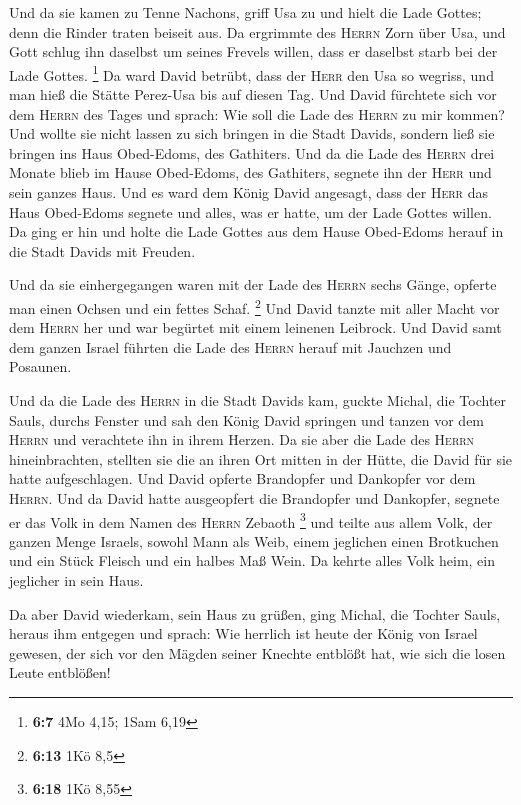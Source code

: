  Und da sie kamen zu Tenne Nachons, griff Usa zu und hielt
die Lade Gottes; denn die Rinder traten beiseit aus.  Da
ergrimmte des \textsc{Herrn} Zorn über Usa, und Gott schlug ihn daselbst
um seines Frevels willen, dass er daselbst starb bei der Lade Gottes.
\footnote{\textbf{6:7} 4Mo 4,15; 1Sam 6,19}  Da ward David
betrübt, dass der \textsc{Herr} den Usa so wegriss, und man hieß die
Stätte Perez-Usa bis auf diesen Tag.  Und David fürchtete
sich vor dem \textsc{Herrn} des Tages und sprach: Wie soll die Lade des
\textsc{Herrn} zu mir kommen?  Und wollte sie nicht
lassen zu sich bringen in die Stadt Davids, sondern ließ sie bringen ins
Haus Obed-Edoms, des Gathiters.  Und da die Lade des
\textsc{Herrn} drei Monate blieb im Hause Obed-Edoms, des Gathiters,
segnete ihn der \textsc{Herr} und sein ganzes Haus.  Und
es ward dem König David angesagt, dass der \textsc{Herr} das Haus
Obed-Edoms segnete und alles, was er hatte, um der Lade Gottes willen.
Da ging er hin und holte die Lade Gottes aus dem Hause Obed-Edoms herauf
in die Stadt Davids mit Freuden.

 Und da sie einhergegangen waren mit der Lade des
\textsc{Herrn} sechs Gänge, opferte man einen Ochsen und ein fettes
Schaf. \footnote{\textbf{6:13} 1Kö 8,5}  Und David tanzte
mit aller Macht vor dem \textsc{Herrn} her und war begürtet mit einem
leinenen Leibrock.  Und David samt dem ganzen Israel
führten die Lade des \textsc{Herrn} herauf mit Jauchzen und Posaunen.

 Und da die Lade des \textsc{Herrn} in die Stadt Davids
kam, guckte Michal, die Tochter Sauls, durchs Fenster und sah den König
David springen und tanzen vor dem \textsc{Herrn} und verachtete ihn in
ihrem Herzen.  Da sie aber die Lade des \textsc{Herrn}
hineinbrachten, stellten sie die an ihren Ort mitten in der Hütte, die
David für sie hatte aufgeschlagen. Und David opferte Brandopfer und
Dankopfer vor dem \textsc{Herrn}.  Und da David hatte
ausgeopfert die Brandopfer und Dankopfer, segnete er das Volk in dem
Namen des \textsc{Herrn} Zebaoth \footnote{\textbf{6:18} 1Kö 8,55}
 und teilte aus allem Volk, der ganzen Menge Israels,
sowohl Mann als Weib, einem jeglichen einen Brotkuchen und ein Stück
Fleisch und ein halbes Maß Wein. Da kehrte alles Volk heim, ein
jeglicher in sein Haus.

 Da aber David wiederkam, sein Haus zu grüßen, ging
Michal, die Tochter Sauls, heraus ihm entgegen und sprach: Wie herrlich
ist heute der König von Israel gewesen, der sich vor den Mägden seiner
Knechte entblößt hat, wie sich die losen Leute entblößen!

